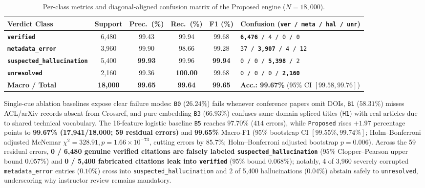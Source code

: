 {\setlength{\tabcolsep}{3.5pt}
\begin{table}[!htbp]
\centering
\caption{Per-class metrics and diagonal-aligned confusion matrix of the Proposed engine ($N = 18{,}000$).}\label{tab:per-class}
\begin{tabular}{|L{0.25}|C{0.12}|C{0.11}|C{0.11}|C{0.11}|L{0.30}|}
\hline
\textbf{Verdict Class} & \textbf{Support} & \textbf{Prec.\ (\%)} & \textbf{Rec.\ (\%)} & \textbf{F1 (\%)} & \textbf{Confusion (\texttt{ver / meta / hal / unr})} \\
\hline
\textbf{\texttt{verified}} & 6,480 & 99.43 & 99.94 & 99.68 & \texttt{\textbf{6,476} / 4 / 0 / 0} \\
\hline
\textbf{\texttt{metadata\_error}} & 3,960 & 99.90 & 98.66 & 99.28 & \texttt{37 / \textbf{3,907} / 4 / 12} \\
\hline
\textbf{\texttt{suspected\_hallucination}} & 5,400 & \textbf{99.93} & 99.96 & \textbf{99.94} & \texttt{0 / 0 / \textbf{5,398} / 2} \\
\hline
\textbf{\texttt{unresolved}} & 2,160 & 99.36 & \textbf{100.00} & 99.68 & \texttt{0 / 0 / 0 / \textbf{2,160}} \\
\hline
\textbf{Macro / Total} & \textbf{18,000} & \textbf{99.65} & \textbf{99.64} & \textbf{99.65} & \textbf{Acc.: 99.67\%} (95\% CI $[99.58, 99.76]$) \\
\hline
\end{tabular}
\end{table}
}

Single-cue ablation baselines expose clear failure modes: \texttt{B0} ($26.24\%$) fails whenever conference papers omit DOIs, \texttt{B1} ($58.31\%$) misses ACL/arXiv records absent from Crossref, and pure embedding \texttt{B3} ($66.93\%$) confuses same-domain spliced titles (\texttt{H1}) with real articles due to shared technical vocabulary. The 16-feature logistic baseline \texttt{B5} reaches $97.70\%$ ($414$ errors), while \texttt{Proposed} rises $+1.97$ percentage points to \textbf{99.67\% (17,941/18,000; 59 residual errors)} and \textbf{99.65\%} Macro-F1 ($95\%$ bootstrap CI $[99.55\%, 99.74\%]$; Holm--Bonferroni adjusted McNemar $\chi^2 = 328.91, p = 1.66 \times 10^{-73}$, cutting errors by $85.7\%$; Holm--Bonferroni adjusted bootstrap $p = 0.006$). Across the 59 residual errors, \textbf{0 / 6,480 genuine verified citations are falsely labeled \texttt{suspected\_hallucination}} ($95\%$ Clopper--Pearson upper bound $0.057\%$) and \textbf{0 / 5,400 fabricated citations leak into \texttt{verified}} ($95\%$ bound $0.068\%$); notably, 4 of 3,960 severely corrupted \texttt{metadata\_error} entries ($0.10\%$) cross into \texttt{suspected\_hallucination} and 2 of 5,400 hallucinations ($0.04\%$) abstain safely to \texttt{unresolved}, underscoring why instructor review remains mandatory.

